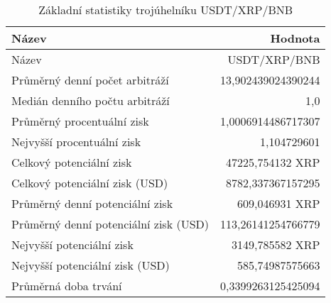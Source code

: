 \begin{table}\centering
\caption{Základní statistiky trojúhelníku USDT/XRP/BNB}
\label{USDTXRPBNB_stats}
\begin{tabular}{|| l | r ||}
\hline Název & Hodnota \\ 
\hline\hline Název & USDT/XRP/BNB \\ 
\hline Průměrný denní počet arbitráží & 13,902439024390244 \\ 
\hline Medián denního počtu arbitráží & 1,0 \\ 
\hline Průměrný procentuální zisk & 1,0006914486717307 \\ 
\hline Nejvyšší procentuální zisk & 1,104729601 \\ 
\hline Celkový potenciální zisk & 47225,754132 XRP \\ 
\hline Celkový potenciální zisk (USD) & 8782,337367157295 \\ 
\hline Průměrný denní potenciální zisk & 609,046931 XRP \\ 
\hline Průměrný denní potenciální zisk (USD) & 113,26141254766779 \\ 
\hline Nejvyšší potenciální zisk & 3149,785582 XRP \\ 
\hline Nejvyšší potenciální zisk (USD) & 585,74987575663 \\ 
\hline Průměrná doba trvání & 0,3399263125425094 \\ 
\hline
\end{tabular}
\end{table}